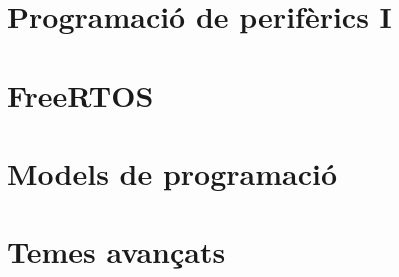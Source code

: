 





\part{Programació de perifèrics I}
\label{part:programacio}


\part{FreeRTOS}
\label{part:freertos}


\part{Models de programació}
\label{part:modelsprogramacio}


\part{Temes avançats}
\label{part:avançats}


% 

